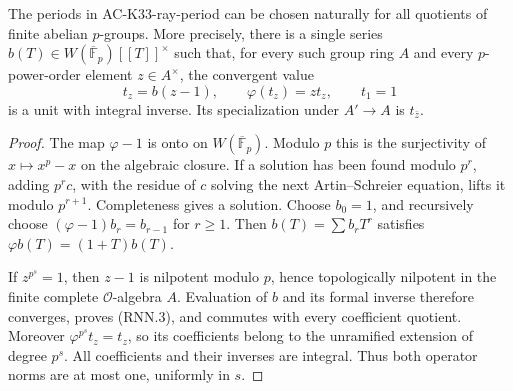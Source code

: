 \begin{lemma}
\label{AC-K33-ray-period-natural}
The periods in AC-K33-ray-period can be chosen naturally for all
quotients of finite abelian \(p\)-groups.  More precisely, there is
a single series \(b(T)\in W(\overline{\mathbb F}_p)[[T]]^\times\)
such that, for every such group ring \(A\) and every \(p\)-power-order
element \(z\in A^\times\), the convergent value
\[
 t_z=b(z-1),\qquad \varphi(t_z)=zt_z,\qquad t_1=1
 \tag{RNN.3}
\]
is a unit with integral inverse.  Its specialization under
\(A'\to A\) is \(t_{\bar z}\).
\end{lemma}
\begin{proof}
The map \(\varphi-1\) is onto on \(W(\overline{\mathbb F}_p)\).
Modulo \(p\) this is the surjectivity of \(x\mapsto x^p-x\) on the
algebraic closure.  If a solution has been found modulo \(p^r\),
adding \(p^r c\), with the residue of \(c\) solving the next
Artin--Schreier equation, lifts it modulo \(p^{r+1}\).  Completeness
gives a solution.  Choose \(b_0=1\), and recursively choose
\((\varphi-1)b_r=b_{r-1}\) for \(r\geq1\).  Then
\(b(T)=\sum b_rT^r\) satisfies
\(\varphi b(T)=(1+T)b(T)\).

If \(z^{p^s}=1\), then \(z-1\) is nilpotent modulo \(p\), hence
topologically nilpotent in the finite complete \(\mathcal O\)-algebra
\(A\).  Evaluation of \(b\) and its formal inverse therefore
converges, proves (RNN.3), and commutes with every coefficient
quotient.  Moreover \(\varphi^{p^s}t_z=t_z\), so its coefficients
belong to the unramified extension of degree \(p^s\).
All coefficients and their inverses are integral.  Thus both
operator norms are at most one, uniformly in \(s\).
\end{proof}


